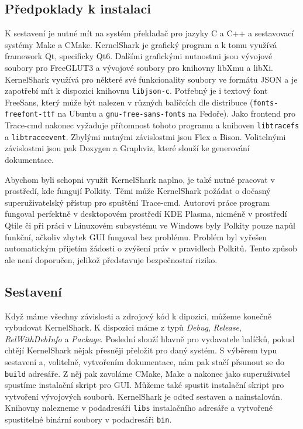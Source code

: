 \subsection*{Předpoklady k instalaci}

K sestavení je nutné mít na systém překladač pro jazyky C a C++ a sestavovací systémy Make a CMake. KernelShark je grafický program a k tomu využívá framework Qt, specificky Qt6. Dalšími grafickými nutnostmi jsou vývojové soubory pro FreeGLUT3 a vývojové soubory pro knihovny libXmu a libXi. KernelShark využívá pro některé své funkcionality soubory ve formátu JSON a je zapotřebí mít k dispozici knihovnu \texttt{libjson-c}. Potřebný je i textový font FreeSans, který může být nalezen v různých balíčcích dle distribuce (\texttt{fonts-freefont-ttf} na Ubuntu a \texttt{gnu-free-sans-fonts} na Fedoře). Jako frontend pro Trace-cmd nakonec vyžaduje přítomnost tohoto programu a knihoven \texttt{libtracefs} a \texttt{libtraceevent}. Zbylými nutnými závislostmi jsou Flex a Bison. Volitelnými závislostmi jsou pak Doxygen a Graphviz, které slouží ke generování dokumentace.

Abychom byli schopni využít KernelShark naplno, je také nutné pracovat v prostředí, kde fungují Polkity. Těmi může KernelShark požádat o dočasný superuživatelský přístup pro spuštění Trace-cmd. Autorovi práce program fungoval perfektně v desktopovém prostředí KDE Plasma, nicméně v prostředí Qtile či při práci v Linuxovém subsystému ve Windows byly Polkity pouze napůl funkční, ačkoliv zbytek GUI fungoval bez problému. Problém byl vyřešen automatickým přijetím žádosti o zvýšení práv v pravidlech Polkitů. Tento způsob ale není doporučen, jelikož představuje bezpečnostní riziko.

\subsection*{Sestavení}

Když máme všechny závislosti a zdrojový kód k dipozici, můžeme konečně vybudovat KernelShark. K dispozici máme z typů \emph{Debug}, \emph{Release}, \emph{RelWithDebInfo} a \emph{Package}. Poslední slouží hlavně pro vydavatele balíčků, pokud chtějí KernelShark nějak přesněji přeložit pro daný systém. S výběrem typu sestavení a, volitelně, vytvořením dokumentace, nám pak stačí přsunout se do \texttt{build} adresáře. Z něj pak zavoláme CMake, Make a nakonec jako superuživatel spustíme instalační skript pro GUI. Můžeme také spustit instalační skript pro vytvoření vývojových souborů. KernelShark je odteď sestaven a nainstalován. Knihovny nalezneme v podadresáři \texttt{libs} instalačního adresáře a vytvořené spustitelné binární soubory v podadresáři \texttt{bin}.

